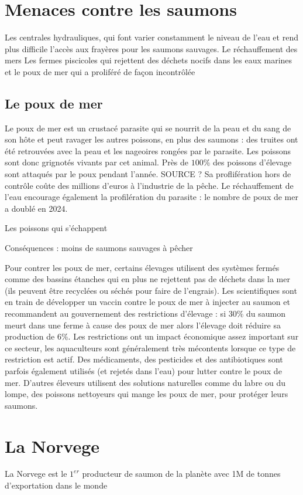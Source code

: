 \documentclass{article}
\begin{document}
\section{Menaces contre les saumons}
Les centrales hydrauliques, qui font varier constamment le niveau de l'eau et rend plus difficile l'accès aux frayères pour les saumons sauvages.
Le réchauffement des mers
Les fermes piscicoles qui rejettent des déchets nocifs dans les eaux marines et le poux de mer qui a proliféré de façon incontrôlée

\subsection{Le poux de mer}
Le poux de mer est un crustacé parasite qui se nourrit de la peau et du sang de son hôte et peut ravager les autres poissons, en plus des saumons : des truites ont été retrouvées avec la peau et les nageoires rongées par le parasite. Les poissons sont donc grignotés vivants par cet animal.
Près de $100\%$ des poissons d'élevage sont attaqués par le poux pendant l'année. SOURCE ?
Sa proflifération hors de contrôle coûte des millions d'euros à l'industrie de la pêche. Le réchauffement de l'eau encourage également la profilération du parasite : le nombre de poux de mer a doublé en 2024.



Les poissons qui s'échappent

Conséquences : moins de saumons sauvages à pêcher


Pour contrer les poux de mer, certains élevages utilisent des systèmes fermés comme des bassins étanches qui en plus ne rejettent pas de déchets dans la mer (ils peuvent être recyclées ou séchés pour faire de l'engrais).
Les scientifiques sont en train de développer un vaccin contre le poux de mer à injecter au saumon et recommandent au gouvernement des restrictions d'élevage : si $30 \%$ du saumon meurt dans une ferme à cause des poux de mer alors l'élevage doit réduire sa production de $6 \%$.
Les restrictions ont un impact économique assez important sur ce secteur, les aquaculteurs sont généralement très mécontents lorsque ce type de restriction est actif.
Des médicaments, des pesticides et des antibiotiques \cite{FT2} \cite{FT3} sont parfois également utilisés (et rejetés dans l'eau) pour lutter contre le poux de mer. 
D'autres éleveurs utilisent des solutions naturelles comme du labre ou du lompe, des poissons nettoyeurs qui mange les poux de mer, pour protéger leurs saumons.
\section{La Norvege}
La Norvege est le $1^{er}$ producteur de saumon de la planète avec 1M de tonnes d'exportation dans le monde
\end{document}
